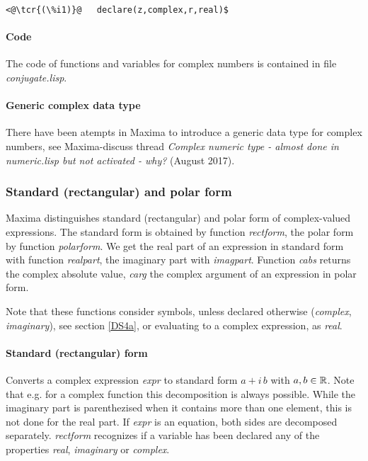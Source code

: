 \documentclass[../Maxima_Workbook.tex]{subfiles}
\begin{document}
\vspace{2mm}\begin{lstlisting}
<@\tcr{(\%i1)}@   declare(z,complex,r,real)$ \end{lstlisting}\vspace{-1mm}

\paragraph{Code} \mbox{}

\lz The code of functions and variables for complex numbers is contained in file \emph{conjugate.lisp}.

\paragraph{Generic complex data type} \mbox{}

\lz There have been atempts in Maxima to introduce a generic data type for complex numbers, see Maxima-discuss thread \emph{Complex numeric type - almost done in numeric.lisp but not activated - why?} (August 2017).

\subsubsection{Standard (rectangular) and polar form}\label{DS4}

Maxima distinguishes standard (rectangular) and polar form of complex-valued expressions. The standard form is obtained by function \emph{rectform}, the polar form by function \emph{polarform}. We get the real part of an expression in standard form with function \emph{realpart}, the imaginary part with \emph{imagpart}. Function \emph{cabs} returns the complex absolute value, \emph{carg} the complex argument of an expression in polar form.

\lz Note that these functions consider symbols, unless declared otherwise (\emph{complex}, \emph{imaginary}), see section \ref{DS4a}, or evaluating to a complex expression, as \emph{real}. 

\paragraph{Standard (rectangular) form} \mbox{}

\lzz {} \hfill \tcr{[function]}

\lz Converts a complex expression \emph{expr} to standard form  $ a + i \, b $ with $ a,b \in \mathbb{R} $. Note that e.g. for a complex function this decomposition is always possible. While the imaginary part is parenthezised when it contains more than one element, this is not done for the real part. If \emph{expr} is an equation, both sides are decomposed separately. \emph{rectform} recognizes if a variable has been declared any of the properties \emph{real}, \emph{imaginary} or \emph{complex}.
\end{document}

